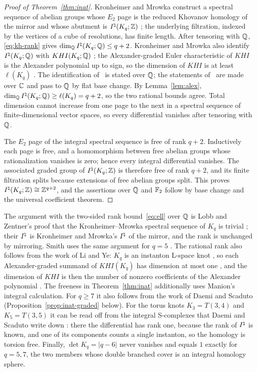 \begin{proof}[Proof of Theorem~\ref{thm:inat}]
Kronheimer and Mrowka construct a spectral sequence of abelian groups whose $E_2$ page is the reduced
Khovanov homology of the mirror and whose abutment is $I^{\natural}(K_q;\mathbb{Z})$ \cite[Prop.~1.2 and
Thm.~8.12]{KM2}; the underlying filtration, indexed by the vertices of a cube of resolutions, has
finite length. After tensoring with $\mathbb{Q}$, \eqref{eq:kh-rank} gives $\dim_{\mathbb{Q}}I^{\natural}(K_q;\mathbb{Q})\le q+2$.
Kronheimer and Mrowka also identify $I^{\natural}(K_q;\mathbb{Q})$ with $KHI(K_q;\mathbb{Q})$ \cite[Prop.~1.4]{KM2}; the
Alexander-graded Euler characteristic of $KHI$ is the Alexander polynomial up to sign, so the dimension
of $KHI$ is at least $\ell(K_q)$ \cite[Thm.~1.1 and Cor.~1.2]{KMAlex}. The identification
of~\cite[Prop.~1.4]{KM2} is stated over $\mathbb{Q}$; the statements of~\cite{KMAlex} are made over $\mathbb{C}$ and pass to $\mathbb{Q}$
by flat base change. By Lemma~\ref{lem:alex},
$\dim_{\mathbb{Q}}I^{\natural}(K_q;\mathbb{Q})\ge\ell(K_q)=q+2$, so the two rational bounds agree. Total dimension cannot
increase from one page to the next in a spectral sequence of finite-dimensional vector spaces, so
every differential vanishes after tensoring with $\mathbb{Q}$.

The $E_2$ page of the integral spectral sequence is free of rank $q+2$. Inductively each page is free,
and a homomorphism between free abelian groups whose rationalization vanishes is zero; hence every
integral differential vanishes. The associated graded group of $I^{\natural}(K_q;\mathbb{Z})$ is therefore free of
rank $q+2$, and its finite filtration splits because extensions of free abelian groups split. This
proves $I^{\natural}(K_q;\mathbb{Z})\cong\mathbb{Z}^{q+2}$, and the assertions over $\mathbb{Q}$ and $\mathbb{F}_2$ follow by base change and
the universal coefficient theorem.
\end{proof}

\begin{remark}\label{rem:inat-attribution}
The argument with the two-sided rank bound~\eqref{eq:ell} over $\mathbb{Q}$ is Lobb and Zentner's proof that the
Kronheimer--Mrowka spectral sequence of $K_q$ is trivial \cite[Prop.~4.7]{LZ}; their $I^{\natural}$ is Kronheimer and Mrowka's $I^{\natural}$ of the mirror,
and the rank is unchanged by mirroring. Smith uses the same argument for $q=5$ \cite[proof of
Thm.~5.9]{Smith}. The rational rank also follows from the work of Li and Ye: $K_q$ is an instanton
L-space knot \cite[Prop.~7.1(2)]{LiYe}, so each Alexander-graded summand of $KHI(K_q)$ has dimension at
most one \cite[Thm.~1.9]{LiYe}, and the dimension of $KHI$ is then the number of nonzero coefficients
of the Alexander polynomial \cite[Thm.~1.1]{KMAlex}. The freeness in Theorem~\ref{thm:inat}
additionally uses Manion's integral calculation. For $q\ge7$ it also follows from the work of Daemi
and Scaduto (Proposition~\ref{prop:inat-graded} below). For the torus knots $K_3=T(3,4)$ and
$K_5=T(3,5)$ it can be read off from the integral S-complexes that Daemi and Scaduto write down
\cite[\S\S9.3--9.4]{DS19}: there the differential has rank one, because the rank of $I^{\natural}$ is known,
and one of its components counts a single instanton, so the homology is torsion free. Finally,
$\det K_q=|q-6|$ never vanishes and equals $1$ exactly for $q=5,7$, the two members whose double
branched cover is an integral homology sphere.
\end{remark}

